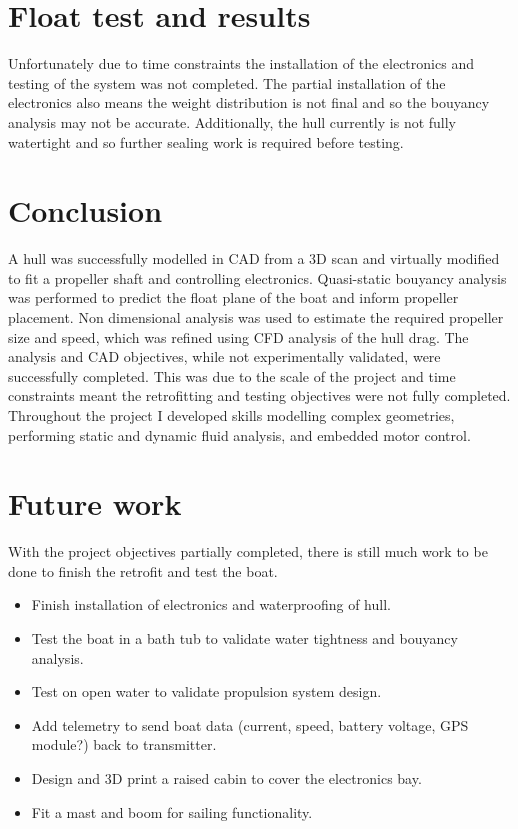 \documentclass{article}
\begin{document}
\section{Float test and results}

Unfortunately due to time constraints the installation of the electronics and testing of the system was not completed.
The partial installation of the electronics also means the weight distribution is not final and so the bouyancy analysis may not be accurate.
Additionally, the hull currently is not fully watertight and so further sealing work is required before testing.

\section{Conclusion}

A hull was successfully modelled in CAD from a 3D scan and virtually modified to fit a propeller shaft and controlling electronics.
Quasi-static bouyancy analysis was performed to predict the float plane of the boat and inform propeller placement.
Non dimensional analysis was used to estimate the required propeller size and speed, which was refined using CFD analysis of the hull drag.
The analysis and CAD objectives, while not experimentally validated, were successfully completed.
This was due to the scale of the project and time constraints meant the retrofitting and testing objectives were not fully completed.
Throughout the project I developed skills modelling complex geometries, performing static and dynamic fluid analysis, and embedded motor control.

\section{Future work}
With the project objectives partially completed, there is still much work to be done to finish the retrofit and test the boat.
\begin{itemize}
    \item Finish installation of electronics and waterproofing of hull.
    \item Test the boat in a bath tub to validate water tightness and bouyancy analysis.
    \item Test on open water to validate propulsion system design.
    \item Add telemetry to send boat data (current, speed, battery voltage, GPS module?) back to transmitter.
    \item Design and 3D print a raised cabin to cover the electronics bay.
    \item Fit a mast and boom for sailing functionality.
\end{itemize}
\end{document}
